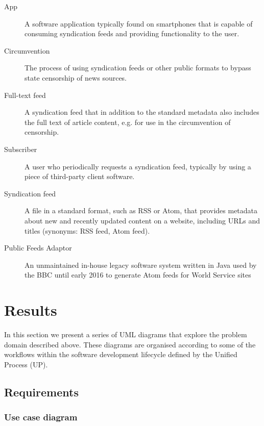\documentclass[a4paper]{article}
\begin{document}
\begin{description}

\item [App]
A software application typically found on smartphones that is capable of consuming syndication feeds and providing functionality to the user.

\item [Circumvention]
The process of using syndication feeds or other public formats to bypass state censorship of news sources.

\item [Full-text feed]
A syndication feed that in addition to the standard metadata also includes the full text of article content, e.g. for use in the circumvention of censorship.

\item [Subscriber]
A user who periodically requests a syndication feed, typically by using a piece of third-party client software.

\item [Syndication feed]
A file in a standard format, such as RSS or Atom, that provides metadata about new and recently updated content on a website, including URLs and titles (synonyms: RSS feed, Atom feed).

\item [Public Feeds Adaptor]
An unmaintained in-house legacy software system written in Java used by the BBC until early 2016 to generate Atom feeds for World Service sites

\end{description}

\section{Results}

In this section we present a series of UML diagrams that explore the problem domain described above. These diagrams are organised according to some of the workflows within the software development lifecycle defined by the Unified Process (UP).

\subsection{Requirements}

\subsubsection{Use case diagram}
\end{document}
